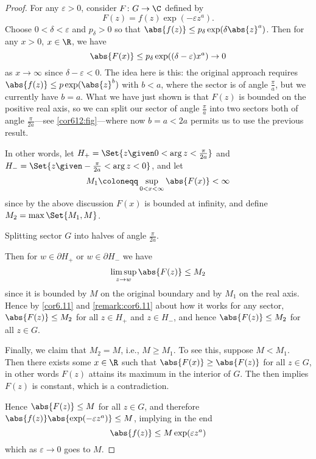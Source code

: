 \begin{proof}
	For any $\varepsilon > 0$, consider $F \colon G \to \C$ defined by
	\[
		F(z) = f(z) \exp(-\varepsilon z^a).
	\]
	Choose $0 < \delta < \varepsilon$ and $p_\delta > 0$ so that $\abs{f(z)} \leq p_\delta \exp(\delta \abs{z}^a)$.
	Then for any $x > 0$, $x \in \R$, we have
	\[
		\abs{F(x)} \leq p_\delta \exp((\delta - \varepsilon) x^a) \to 0
	\]
	as $x \to \infty$ since $\delta - \varepsilon < 0$.
	The idea here is this: the original approach requires $\abs{f(z)} \leq p \exp(\abs{z}^b)$ with $b < a$, where the sector is of angle $\frac{\pi}{a}$, but we currently have $b = a$.
	What we have just shown is that $F(z)$ is bounded on the positive real axis, so we can split our sector of angle $\frac{\pi}{a}$ into two sectors both of angle $\frac{\pi}{2 a}$---see \autoref{cor612:fig}---where now $b = a < 2 a$ permits us to use the previous result.

	In other words, let $H_+ = \Set{z \given 0 < \arg z < \frac{\pi}{2 a}}$ and $H_- = \Set{ z \given -\frac{\pi}{2 a} < \arg z < 0}$, and let
	\[
		M_1 \coloneqq \sup_{0 < x < \infty} \abs{F(x)} < \infty
	\]
	since by the above discussion $F(x)$ is bounded at infinity, and define $M_2 = \max\Set{M_1, M}$.

	\begin{marginfigure}
		\caption{\label{cor612:fig} Splitting sector $G$ into halves of angle $\frac{\pi}{2 a}$.}
	\end{marginfigure}

	Then for $w \in \partial H_+$ or $w \in \partial H_-$ we have
	\[
		\limsup_{z \to w} \abs{F(z)} \leq M_2
	\]
	since it is bounded by $M$ on the original boundary and by $M_1$ on the real axis.
	Hence by \autoref{cor6.11} and \autoref{remark:cor6.11} about how it works for any sector, $\abs{F(z)} \leq M_2$ for all $z \in H_+$ and $z \in H_-$, and hence $\abs{F(z)} \leq M_2$ for all $z \in G$.

	Finally, we claim that $M_2 = M$, i.e., $M \geq M_1$.
	To see this, suppose $M < M_1$.
	Then there exists some $x \in \R$ such that $\abs{F(x)} \geq \abs{F(z)}$ for all $z \in G$, in other words $F(z)$ attains its maximum in the interior of $G$.
	The  then implies $F(z)$ is constant, which is a contradiction.

	Hence $\abs{F(z)} \leq M$ for all $z \in G$, and therefore $\abs{f(z)} \abs{\exp(-\varepsilon z^a)} \leq M$, implying in the end
	\[
		\abs{f(z)} \leq M \exp(\varepsilon z^a)
	\]
	which as $\varepsilon \to 0$ goes to $M$.
\end{proof}
